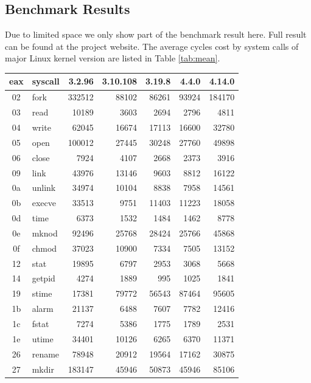 \documentclass{article}
\begin{document}
\subsection{Benchmark Results}

Due to limited space we only show part of the benchmark result here. Full result can be found at the project website.
The average cycles cost by system calls of major Linux kernel version are listed in Table \ref{tab:mean}.


\begin{table}
    \centering
    \begin{tabular}{clrrrrr}
        \toprule
        eax & syscall & 3.2.96 & 3.10.108 & 3.19.8 & 4.4.0 & 4.14.0 \\
        \midrule
        02 & fork & 332512 & 88102 & 86261 & 93924 & 184170 \\
        03 & read & 10189 & 3603 & 2694 & 2796 & 4811 \\
        04 & write & 62045 & 16674 & 17113 & 16600 & 32780 \\
        05 & open & 100012 & 27445 & 30248 & 27760 & 49898 \\
        06 & close & 7924 & 4107 & 2668 & 2373 & 3916 \\
        09 & link & 43976 & 13146 & 9603 & 8812 & 16122 \\
        0a & unlink & 34974 & 10104 & 8838 & 7958 & 14561 \\
        0b & execve & 33513 & 9751 & 11403 & 11223 & 18058 \\
        0d & time & 6373 & 1532 & 1484 & 1462 & 8778 \\
        0e & mknod & 92496 & 25768 & 28424 & 25766 & 45868 \\
        0f & chmod & 37023 & 10900 & 7334 & 7505 & 13152 \\
        12 & stat & 19895 & 6797 & 2953 & 3068 & 5668 \\
        14 & getpid & 4274 & 1889 & 995 & 1025 & 1841 \\
        19 & stime & 17381 & 79772 & 56543 & 87464 & 95605 \\
        1b & alarm & 21137 & 6488 & 7607 & 7782 & 12416 \\
        1c & fstat & 7274 & 5386 & 1775 & 1789 & 2531 \\
        1e & utime & 34401 & 10126 & 6265 & 6370 & 11371 \\
        26 & rename & 78948 & 20912 & 19564 & 17162 & 30875 \\
        27 & mkdir & 183147 & 45946 & 50873 & 45946 & 85106 \\

\end{tabular}
\end{table}
\end{document}
